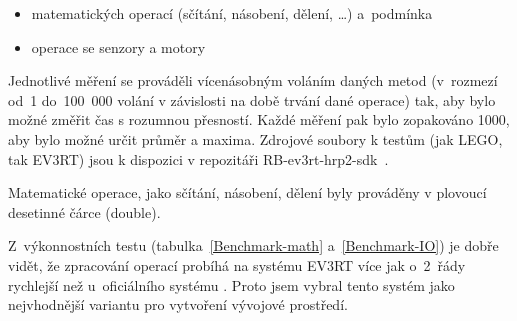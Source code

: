 \begin{itemize}
    \item matematických operací (sčítání, násobení, dělení, \dots) a~podmínka
    \item operace se senzory a motory
\end{itemize}

Jednotlivé měření se prováděli vícenásobným voláním daných metod (v~rozmezí od~1 do~100~000 volání v závislosti na době trvání dané operace) tak, aby bylo možné změřit čas s rozumnou přesností.
Každé měření pak bylo zopakováno 1000, aby bylo možné určit průměr a maxima. 
Zdrojové soubory k testům (jak LEGO, tak EV3RT) jsou k dispozici v repozitáři RB-ev3rt-hrp2-sdk~\cite{RB-ev3rt-hrp2-sdk-github}.

Matematické operace, jako sčítání, násobení, dělení byly prováděny v plovoucí desetinné čárce (double).

Z~výkonnostních testu (tabulka~\ref{Benchmark-math} a~\ref{Benchmark-IO}) je dobře vidět, že zpracování operací probíhá na systému EV3RT více jak o~2~řády rychlejší než u~oficiálního systému \EVthree{}. Proto jsem vybral tento systém jako nejvhodnější variantu pro  vytvoření vývojové prostředí.

